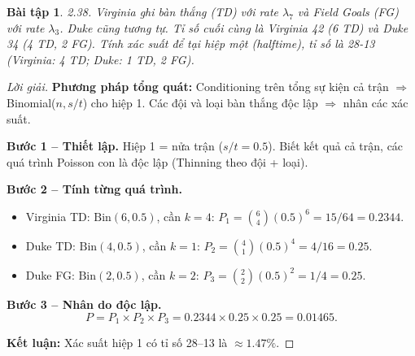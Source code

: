 \documentclass[8pt,a4paper]{article}
\newtheorem{exercise}{Bài tập}
\newenvironment{solution}{\begin{proof}[Lời giải]}{\end{proof}}
\begin{document}
\begin{exercise}
2.38. Virginia ghi bàn thắng (TD) với rate $\lambda_7$ và Field Goals (FG) với rate $\lambda_3$. Duke cũng tương tự. Tỉ số cuối cùng là Virginia 42 (6 TD) và Duke 34 (4 TD, 2 FG). Tính xác suất để tại hiệp một (halftime), tỉ số là 28-13 (Virginia: 4 TD; Duke: 1 TD, 2 FG).
\end{exercise}
\begin{solution}
\textbf{Phương pháp tổng quát:} Conditioning trên tổng sự kiện cả trận $\Rightarrow$ Binomial($n, s/t$) cho hiệp 1. Các đội và loại bàn thắng độc lập $\Rightarrow$ nhân các xác suất.

\textbf{Bước 1 -- Thiết lập.} Hiệp 1 = nửa trận ($s/t = 0.5$). Biết kết quả cả trận, các quá trình Poisson con là độc lập (Thinning theo đội + loại).

\textbf{Bước 2 -- Tính từng quá trình.}
\begin{itemize}[nosep]
  \item Virginia TD: $\text{Bin}(6, 0.5)$, cần $k = 4$: $P_1 = \binom{6}{4}(0.5)^6 = 15/64 = 0.2344$.
  \item Duke TD: $\text{Bin}(4, 0.5)$, cần $k = 1$: $P_2 = \binom{4}{1}(0.5)^4 = 4/16 = 0.25$.
  \item Duke FG: $\text{Bin}(2, 0.5)$, cần $k = 2$: $P_3 = \binom{2}{2}(0.5)^2 = 1/4 = 0.25$.
\end{itemize}

\textbf{Bước 3 -- Nhân do độc lập.}
\[
  P = P_1 \times P_2 \times P_3 = 0.2344 \times 0.25 \times 0.25 = \boxed{0.01465}.
\]

\textbf{Kết luận:} Xác suất hiệp 1 có tỉ số 28--13 là $\approx 1.47\%$.
\end{solution}
\end{document}

